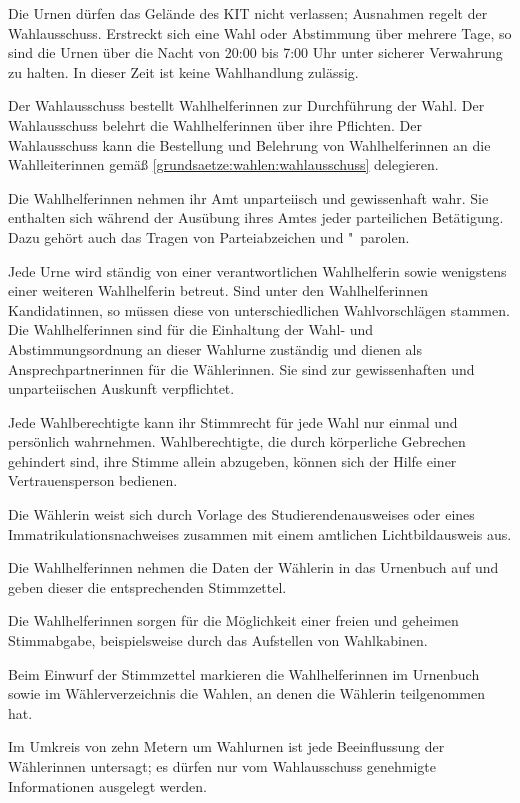 \begin{jurdoc}
Die Urnen dürfen das Gelände des KIT nicht verlassen; Ausnahmen regelt der Wahlausschuss. Erstreckt sich eine Wahl oder Abstimmung über mehrere Tage, so sind die Urnen über die Nacht von 20:00 bis 7:00 Uhr unter sicherer Verwahrung zu halten. In dieser Zeit ist keine Wahlhandlung zulässig.

\label{wahl:wahlhelferinnen}
Der Wahlausschuss bestellt Wahlhelferinnen zur Durchführung der Wahl. Der Wahlausschuss belehrt die Wahlhelferinnen über ihre Pflichten. Der Wahlausschuss kann die Bestellung und Belehrung von Wahlhelferinnen an die Wahlleiterinnen gemäß \ref{grundsaetze:wahlen:wahlausschuss} delegieren.

Die Wahlhelferinnen nehmen ihr Amt unparteiisch und gewissenhaft wahr. Sie enthalten sich während der Ausübung ihres Amtes jeder parteilichen Betätigung. Dazu gehört auch das Tragen von Parteiabzeichen und "~parolen.

\label{wahl:wahlhandlung}
Jede Urne wird ständig von einer verantwortlichen Wahlhelferin sowie wenigstens einer weiteren Wahlhelferin betreut. Sind unter den Wahlhelferinnen Kandidatinnen, so müssen diese von unterschiedlichen Wahlvorschlägen stammen. Die Wahlhelferinnen sind für die Einhaltung der Wahl- und Abstimmungsordnung an dieser Wahlurne zuständig und dienen als Ansprechpartnerinnen für die Wählerinnen. Sie sind zur gewissenhaften und unparteiischen Auskunft verpflichtet.

Jede Wahlberechtigte kann ihr Stimmrecht für jede Wahl nur einmal und persönlich wahrnehmen. Wahlberechtigte, die durch körperliche Gebrechen gehindert sind, ihre Stimme allein abzugeben, können sich der Hilfe einer Vertrauensperson bedienen.

Die Wählerin weist sich durch Vorlage des Studierendenausweises oder  eines Immatrikulationsnachweises zusammen mit einem amtlichen Lichtbildausweis aus. \label{wahl:wahlhandlung:nachweis}

Die Wahlhelferinnen nehmen die Daten der Wählerin in das Urnenbuch auf und geben dieser die entsprechenden Stimmzettel.

Die Wahlhelferinnen sorgen für die Möglichkeit einer freien und geheimen Stimmabgabe, beispielsweise durch das Aufstellen von Wahlkabinen.

Beim Einwurf der Stimmzettel markieren die Wahlhelferinnen im Urnenbuch sowie im Wählerverzeichnis die Wahlen, an denen die Wählerin teilgenommen hat.

Im Umkreis von zehn Metern um Wahlurnen ist jede Beeinflussung der Wählerinnen untersagt; es dürfen nur vom Wahlausschuss genehmigte Informationen ausgelegt werden.


\end{jurdoc}
